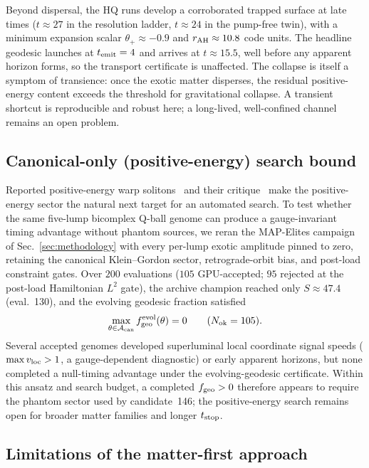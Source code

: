 \documentclass[twocolumn,floatfix,aps,prd,nofootinbib]{revtex4-2}
\begin{document}
Beyond dispersal, the HQ runs develop a corroborated trapped surface at late
times ($t\approx27$ in the resolution ladder, $t\approx24$ in the pump-free
twin), with a minimum expansion scalar $\theta_+\approx-0.9$ and
$r_{\rm AH}\approx10.8$ code units. The headline geodesic launches at
$t_{\rm emit}=4$ and arrives at $t\approx15.5$, well before any apparent
horizon forms, so the transport certificate is unaffected. The collapse is
itself a symptom of transience: once the exotic matter disperses, the residual
positive-energy content exceeds the threshold for gravitational collapse. A
transient shortcut is reproducible and robust here; a long-lived, well-confined
channel remains an open problem.

\subsection{Canonical-only (positive-energy) search bound}
\label{sec:canonical_bound}

Reported positive-energy warp solitons~\cite{lentz21,fell21} and their
critique~\cite{santiago2022} make the positive-energy sector the natural
next target for an automated search. To test whether the same five-lump
bicomplex Q-ball genome can produce a
gauge-invariant timing advantage without phantom sources, we reran the
MAP-Elites campaign of Sec.~\ref{sec:methodology} with every per-lump
exotic amplitude pinned to zero, retaining the canonical Klein--Gordon
sector, retrograde-orbit bias, and post-load constraint gates. Over
$200$ evaluations ($105$ GPU-accepted; $95$ rejected at the post-load
Hamiltonian $L^2$ gate), the archive champion reached only
$S\approx47.4$ (eval.~130), and the evolving geodesic fraction
satisfied
\begin{equation}
  \max_{\theta\in\mathcal{A}_{\rm can}}
  f_{\rm geo}^{\rm evol}(\theta)
  = 0
  \qquad
  (N_{\mathrm{ok}}=105).
  \label{eq:canonical_bound}
\end{equation}
Several accepted genomes developed superluminal local coordinate signal
speeds ($\max v_{\rm loc}>1$, a gauge-dependent diagnostic) or early
apparent horizons, but none completed a
null-timing advantage under the evolving-geodesic certificate. Within this
ansatz and search budget, a completed $f_{\rm geo}>0$ therefore appears to
require the phantom sector used by candidate~146; the positive-energy
search remains open for broader matter families and longer $t_{\rm stop}$.

\subsection{Limitations of the matter-first approach}
\label{sec:limitations}
\end{document}
